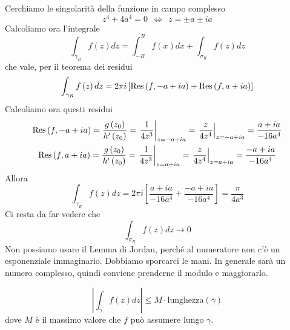 \begin{figure}[htpb]
\end{figure}
\FloatBarrier

Cerchiamo le singolarità della funzione in campo complesso
\begin{equation*}
z^{4} + 4a^{4} = 0\ \ \iff \ \ z = \pm a\pm ia
\end{equation*}
Calcoliamo ora l'integrale
\begin{equation*}
\int _{\gamma _{R}} f\left(z\right) dz = \int ^{R}_{ - R} f\left(x\right) dx + \int _{\sigma _{R}} f\left(z\right) dz
\end{equation*}
che vale, per il teorema dei residui
\begin{equation*}
\int _{\gamma _{R}} f\left(z\right) dz = 2\pi i\left[\operatorname{Res} \left(f, - a + ia\right) + \operatorname{Res} \left(f,a + ia\right)\right]
\end{equation*}
Calcoliamo ora questi residui
\begin{gather*}
\operatorname{Res} \left(f, - a + ia\right) = \frac{g\left(z_{0}\right)}{h'\left(z_{0}\right)} = \left. \frac{1}{4z^{3}}\right| _{z = -a + ia} = \left. \frac{z}{4z^{4}}\right| _{z = -a + ia} = \frac{a + ia}{ - 16a^{4}}\\
\operatorname{Res} \left(f,a + ia\right) = \frac{g\left(z_{0}\right)}{h'\left(z_{0}\right)} = \left. \frac{1}{4z^{3}}\right| _{z = a + ia} = \left. \frac{z}{4z^{4}}\right| _{z = a + ia} = \frac{ - a + ia}{ - 16a^{4}}
\end{gather*}
Allora
\begin{equation*}
\int _{\gamma _{R}} f\left(z\right) dz = 2\pi i\left[\frac{a + ia}{ - 16a^{4}} + \frac{ - a + ia}{ - 16a^{4}}\right] = \frac{\pi }{4a^{3}}
\end{equation*}
Ci resta da far vedere che
\begin{equation*}
\int _{\sigma _{R}} f\left(z\right) dz\rightarrow 0
\end{equation*}
Non possiamo usare il Lemma di Jordan, perché al numeratore non c'è un esponenziale immaginario. Dobbiamo sporcarci le mani. In generale sarà un numero complesso, quindi conviene prenderne il modulo e maggiorarlo.
\begin{rem}
\begin{equation*}
\left| \int _{\gamma } f\left(z\right) dz\right| \leqslant M\cdot \text{lunghezza}\left(\gamma \right)
\end{equation*}
dove $M$ è il massimo valore che $f$ può assumere lungo $\gamma $.
\end{rem}
